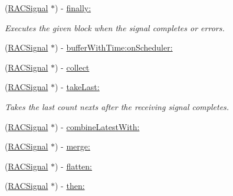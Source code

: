 \begin{DoxyCompactItemize}
(\mbox{\hyperlink{interface_r_a_c_signal}{R\+A\+C\+Signal}} $\ast$) -\/ \mbox{\hyperlink{category_r_a_c_signal_07_operations_08_ae07531acf550fb75812c77adfffc0bb7}{finally\+:}}
\begin{DoxyCompactList}\small\item\em Executes the given block when the signal completes or errors. \end{DoxyCompactList}\item 
(\mbox{\hyperlink{interface_r_a_c_signal}{R\+A\+C\+Signal}} $\ast$) -\/ \mbox{\hyperlink{category_r_a_c_signal_07_operations_08_a7f0cb2086a2123f40552d2eab2a9cc54}{buffer\+With\+Time\+:on\+Scheduler\+:}}
\item 
(\mbox{\hyperlink{interface_r_a_c_signal}{R\+A\+C\+Signal}} $\ast$) -\/ \mbox{\hyperlink{category_r_a_c_signal_07_operations_08_a70b8f976dc0ece9b82e47cdb346a3a09}{collect}}
\item 
\mbox{\label{category_r_a_c_signal_07_operations_08_a0f359e9261777b7999c7229c105211ee}} 
(\mbox{\hyperlink{interface_r_a_c_signal}{R\+A\+C\+Signal}} $\ast$) -\/ \mbox{\hyperlink{category_r_a_c_signal_07_operations_08_a0f359e9261777b7999c7229c105211ee}{take\+Last\+:}}
\begin{DoxyCompactList}\small\item\em Takes the last {\ttfamily count} {\ttfamily next}s after the receiving signal completes. \end{DoxyCompactList}\item 
(\mbox{\hyperlink{interface_r_a_c_signal}{R\+A\+C\+Signal}} $\ast$) -\/ \mbox{\hyperlink{category_r_a_c_signal_07_operations_08_afab1b19558df566351cf87e466a5022f}{combine\+Latest\+With\+:}}
\item 
(\mbox{\hyperlink{interface_r_a_c_signal}{R\+A\+C\+Signal}} $\ast$) -\/ \mbox{\hyperlink{category_r_a_c_signal_07_operations_08_aeda66daaf146a2d218ba7819297628a9}{merge\+:}}
\item 
(\mbox{\hyperlink{interface_r_a_c_signal}{R\+A\+C\+Signal}} $\ast$) -\/ \mbox{\hyperlink{category_r_a_c_signal_07_operations_08_a72e5f2fd80960ee5422e08ceef0f4e2c}{flatten\+:}}
\item 
(\mbox{\hyperlink{interface_r_a_c_signal}{R\+A\+C\+Signal}} $\ast$) -\/ \mbox{\hyperlink{category_r_a_c_signal_07_operations_08_aeed35de5a36e70f87721a0ad6ffabecd}{then\+:}}
\item 
\mbox{\label{category_r_a_c_signal_07_operations_08_a68bff1ad76f3dddda45dcf3dc98a1ae2}} 

\end{DoxyCompactItemize}
